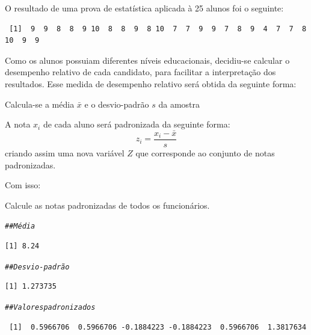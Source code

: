 \documentclass[a4paper,11pt,fleqn]{article}\usepackage[]{graphicx}\usepackage[]{color}
\makeatletter
\newcommand{\hlcom}[1]{\textcolor[rgb]{0.4,0.4,0.4}{\textit{#1}}}%
\newenvironment{kframe}{%
 \def\at@end@of@kframe{}%
 \ifinner\ifhmode%
  \def\at@end@of@kframe{\end{minipage}}%
  \begin{minipage}{\columnwidth}%
 \fi\fi%
 \def\FrameCommand##1{\hskip\@totalleftmargin \hskip-\fboxsep
 \colorbox{shadecolor}{##1}\hskip-\fboxsep
     \hskip-\linewidth \hskip-\@totalleftmargin \hskip\columnwidth}%
 \MakeFramed {\advance\hsize-\width
   \@totalleftmargin\z@ \linewidth\hsize
   \@setminipage}}%
 {\par\unskip\endMakeFramed%
 \at@end@of@kframe}
\newenvironment{knitrout}{}{} %
\theoremstyle{definition}
\makeatother
\begin{document}
\begin{compactenum}[9.] %
\item O resultado de uma prova de estatística aplicada à 25 alunos foi o
  seguinte:
\begin{knitrout}\small
{}\color{fgcolor}\begin{kframe}
\begin{verbatim}
 [1]  9  9  8  8  9 10  8  8  9  8 10  7  7  9  9  7  8  9  4  7  7  8 10  9  9
\end{verbatim}
\end{kframe}
\end{knitrout}
Como os alunos possuiam diferentes níveis educacionais, decidiu-se
calcular o desempenho relativo de cada candidato, para facilitar a
interpretação dos resultados. Esse medida de desempenho relativo será
obtida da seguinte forma:
\begin{compactenum}[1.]
\item Calcula-se a média $\bar{x}$ e o desvio-padrão $s$ da amostra
\item A nota $x_i$ de cada aluno será padronizada da seguinte forma:
  \begin{equation*}
    z_i = \frac{x_i - \bar{x}}{s}
  \end{equation*}
  criando assim uma nova variável $Z$ que corresponde ao conjunto de
  notas padronizadas.
\end{compactenum}
Com isso:
\begin{compactenum}
\item Calcule as notas padronizadas de todos os funcionários.
\begin{knitrout}\small
{}\color{fgcolor}\begin{kframe}
\begin{alltt}
\hlcom{## Média}
\end{alltt}
\begin{verbatim}
[1] 8.24
\end{verbatim}
\begin{alltt}
\hlcom{## Desvio-padrão}
\end{alltt}
\begin{verbatim}
[1] 1.273735
\end{verbatim}
\begin{alltt}
\hlcom{## Valores padronizados}
\end{alltt}
\begin{verbatim}
 [1]  0.5966706  0.5966706 -0.1884223 -0.1884223  0.5966706  1.3817634

\end{verbatim}
\end{kframe}
\end{knitrout}
\end{compactenum}
\end{compactenum}
\end{document}
